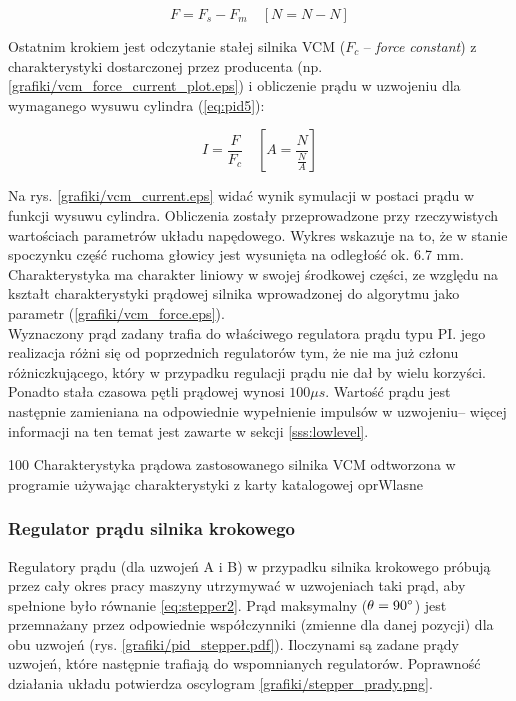 \begin{equation} \label{eq:pid5}
	F = F_s - F_m \quad [ N = N - N ]
\end{equation}

Ostatnim krokiem jest odczytanie stałej silnika VCM ($ F_c $ -- {\it force constant}) z charakterystyki dostarczonej przez producenta (np. \ref{grafiki/vcm_force_current_plot.eps}) i obliczenie prądu w uzwojeniu dla wymaganego wysuwu cylindra (\ref{eq:pid5}):

\begin{equation} \label{eq:pid6}
	I = \frac{F}{F_c} \quad [ A = \frac{N}{\frac{N}{A}} ]
\end{equation}
	
Na rys. \ref{grafiki/vcm_current.eps} widać wynik symulacji w postaci prądu w funkcji wysuwu cylindra. Obliczenia zostały przeprowadzone przy rzeczywistych wartościach parametrów układu napędowego. Wykres wskazuje na to, że w stanie spoczynku część ruchoma głowicy jest wysunięta na odległość ok. 6.7 mm. Charakterystyka ma charakter liniowy w swojej środkowej części, ze względu na kształt charakterystyki prądowej silnika wprowadzonej do algorytmu jako parametr (\ref{grafiki/vcm_force.eps}). \\


Wyznaczony prąd zadany trafia do właściwego regulatora prądu typu PI. jego realizacja różni się od poprzednich regulatorów tym, że nie ma już członu różniczkującego, który w przypadku regulacji prądu nie dał by wielu korzyści. Ponadto stała czasowa pętli prądowej wynosi $ 100 \mu s $. Wartość prądu jest następnie zamieniana na odpowiednie wypełnienie impulsów w uzwojeniu-- więcej informacji na ten temat jest zawarte w sekcji \ref{sss:lowlevel}.

	{100}
	{Charakterystyka prądowa zastosowanego silnika VCM odtworzona w programie używając charakterystyki z karty katalogowej}
	{oprWlasne}

\subsubsection{Regulator prądu silnika krokowego}

Regulatory prądu (dla uzwojeń A i B) w przypadku silnika krokowego próbują przez cały okres pracy maszyny utrzymywać w uzwojeniach taki prąd, aby spełnione było równanie \ref{eq:stepper2}. Prąd maksymalny ($ \theta = 90\degree $) jest przemnażany przez odpowiednie współczynniki (zmienne dla danej pozycji) dla obu uzwojeń (rys. \ref{grafiki/pid_stepper.pdf}). Iloczynami są zadane prądy uzwojeń, które następnie trafiają do wspomnianych regulatorów. Poprawność działania układu potwierdza oscylogram \ref{grafiki/stepper_prady.png}.

